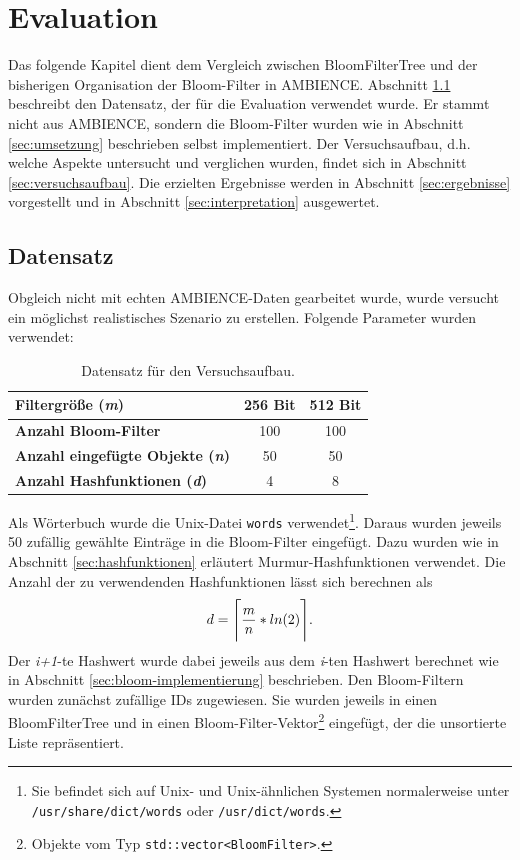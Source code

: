 \chapter{Evaluation}\label{ch:evaluation}
Das folgende Kapitel dient dem Vergleich zwischen BloomFilterTree und der bisherigen Organisation der Bloom-Filter in AMBIENCE. Abschnitt \ref{sec:datensatz} beschreibt den Datensatz, der für die Evaluation verwendet wurde. Er stammt nicht aus AMBIENCE, sondern die Bloom-Filter wurden wie in Abschnitt \ref{sec:umsetzung} beschrieben selbst implementiert. Der Versuchsaufbau, d.h. welche Aspekte untersucht und verglichen wurden, findet sich in Abschnitt \ref{sec:versuchsaufbau}. Die erzielten Ergebnisse werden in Abschnitt \ref{sec:ergebnisse} vorgestellt und in Abschnitt \ref{sec:interpretation} ausgewertet.
\section{Datensatz}\label{sec:datensatz}
Obgleich nicht mit echten AMBIENCE-Daten gearbeitet wurde, wurde versucht ein möglichst realistisches Szenario zu erstellen. Folgende Parameter wurden verwendet:
\begin{center}
\begin{table}[htbp]
{\small
\begin{center}
\begin{tabular}[center]{lcc}
\toprule
\textbf{Filtergröße (\textit{m})} & 256 Bit & 512 Bit\\
\midrule
\textbf{Anzahl Bloom-Filter} & 100 & 100\\
\midrule
\textbf{Anzahl eingefügte Objekte (\textit{n})} & 50 & 50\\
\midrule
\textbf{Anzahl Hashfunktionen (\textit{d})} & 4 & 8\\
\bottomrule
\end{tabular}
\end{center}
} %
\caption[Datensatz für den Versuchsaufbau]{Datensatz für den Versuchsaufbau.\label{tab:Datensatz}}
\end{table}
\end{center}
Als Wörterbuch wurde die Unix-Datei \texttt{words} verwendet\footnote{Sie befindet sich auf Unix- und Unix-ähnlichen Systemen normalerweise unter \texttt{/usr/share/dict/words} oder \texttt{/usr/dict/words}.}. Daraus wurden jeweils 50 zufällig gewählte Einträge in die Bloom-Filter eingefügt. Dazu wurden wie in Abschnitt \ref{sec:hashfunktionen} erläutert Murmur-Hashfunktionen verwendet. Die Anzahl der zu verwendenden Hashfunktionen lässt sich berechnen als 
\[d = \Ceil[\Bigg]{\frac{m}{n} * ln(2)}.\]
\noindent
Der \textit{i+1}-te Hashwert wurde dabei jeweils aus dem \textit{i}-ten Hashwert berechnet wie in Abschnitt \ref{sec:bloom-implementierung} beschrieben. Den Bloom-Filtern wurden zunächst zufällige IDs zugewiesen. Sie wurden jeweils in einen BloomFilterTree und in einen Bloom-Filter-Vektor\footnote{Objekte vom Typ \texttt{std::vector<BloomFilter>}.} eingefügt, der die unsortierte Liste repräsentiert.
\newpage

